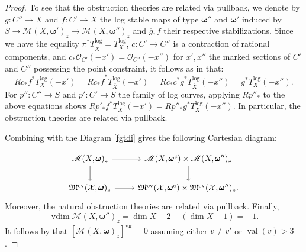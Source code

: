 \documentclass[12pt, oneside]{amsart}   	%
\newcommand{\val}{\operatorname{val}}
\newcommand{\vir}{\operatorname{vir}}
\newcommand{\vdim}{\operatorname{vdim}}
\newcommand{\ev}{\operatorname{ev}}
\numberwithin{equation}{section}
\numberwithin{thm}{section}
\numberwithin{figure}{section}
\begin{document}
\begin{proof}
To see that the obstruction theories are related via pullback, we denote by $g: C'' \rightarrow X$ and $f: C' \rightarrow X$ the log stable maps of type $\pmb\omega''$ and $\pmb\omega'$ induced by $S \rightarrow \mathscr{M}(X,\pmb\omega')_z \rightarrow \mathscr{M}(X,\pmb\omega'')_z$ and $\overline{g},\overline{f}$ their respective stabilizations. Since we have the equality $\pi^*T_{\overline{X}}^{\log} = T_X^{\log}$, $c: C' \rightarrow C''$ is a contraction of rational components, and $c_*\mathcal{O}_{C'}(-x') = \mathcal{O}_{C''}(-x'')$ for $x',x''$ the marked sections of $C'$ and $C''$ possessing the point constraint, it follows as in \cite[Section $6$]{bir_GW} that:
 $$Rc_*f^*T_X^{\log}(-x')=Rc_*\overline{f}^*T_{\overline{X}}^{\log}(-x') = Rc_*c^*\overline{g}^*T_{\overline{X}}^{\log}(-x'')=g^*T_X^{\log}(-x'').$$
For $p'': C'' \rightarrow S$ and $p': C' \rightarrow S$ the family of log curves, applying $Rp''_*$ to the above equations shows $Rp'_*f^*T_X^{\log}(-x') = Rp''_*g^*T_X^{\log}(-x'')$. In particular, the obstruction theories are related via pullback.

Combining \cite[Theorem $C$]{punc} with the Diagram \ref{fgtdi} gives the following Cartesian diagram:



\begin{equation}
\begin{tikzcd}
\mathscr{M}(X,\pmb\omega)_z \arrow{r}\arrow{d} & \mathscr{M}(X,\pmb\omega^c)\times\mathscr{M}(X,\pmb\omega'')_z\arrow{d}\\
\mathfrak{M}^{\ev}(\mathcal{X},\pmb\omega)_z \arrow{r} & \mathfrak{M}^{\ev}(\mathcal{X},\pmb\omega^c)\times \mathfrak{M}^{\ev}(\mathcal{X},\pmb\omega'')_z.
\end{tikzcd}
\end{equation}
Moreover, the natural obstruction theories are related via pullback. Finally, $$\vdim \mathscr{M}(X,\pmb\omega'')_z = \dim X - 2 - (\dim X - 1) = -1.$$ It follows by \cite[Lemma $A.13$]{int_mirror} that $[\mathscr{M}(X,\pmb\omega)_z]^{\vir} = 0$ assuming either $v\not= v'$ or $\val(v) > 3$. 



\end{proof}
\end{document}
